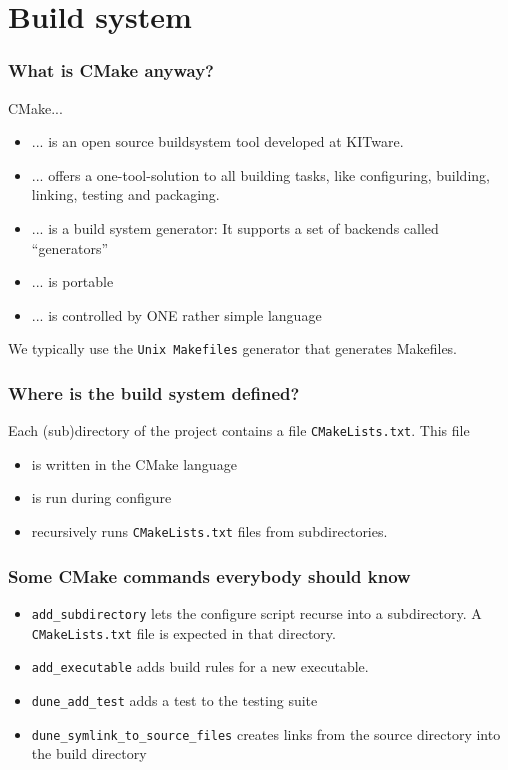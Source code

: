 \documentclass[ignorenonframetext,11pt]{beamer}
\theoremstyle{definition}
\begin{document}
\section{Build system}


\begin{frame}[fragile]
 \frametitle{What is CMake anyway?}
 CMake...
 \begin{itemize}
  \item ... is an open source buildsystem tool developed at KITware.
  \item ... offers a one-tool-solution to all building tasks, like configuring, building, linking, testing and packaging.
  \item ... is a build system generator: It supports a set of backends called ``generators''
  \item ... is portable
  \item ... is controlled by ONE rather simple language
 \end{itemize}
 \vspace{0.5cm}
 We typically use the \lstinline!Unix Makefiles! generator that generates Makefiles.
\end{frame}

\begin{frame}[fragile]
 \frametitle{Where is the build system defined?}
 Each (sub)directory of the project contains a file \lstinline!CMakeLists.txt!. This file
 \begin{itemize}
  \item is written in the CMake language
  \item is run during configure
  \item recursively runs \lstinline!CMakeLists.txt! files from subdirectories.
 \end{itemize}
\end{frame}

\begin{frame}[fragile]
 \frametitle{Some CMake commands everybody should know}

 \begin{itemize}
  \item \lstinline!add_subdirectory! lets the configure script recurse into a subdirectory.
  A \lstinline!CMakeLists.txt! file is expected in that directory.
  \item \lstinline!add_executable! adds build rules for a new executable.
  \item \lstinline!dune_add_test! adds a test to the testing suite
  \item \lstinline!dune_symlink_to_source_files! creates links from the source directory into the build directory
 \end{itemize}
\end{frame}
\end{document}
